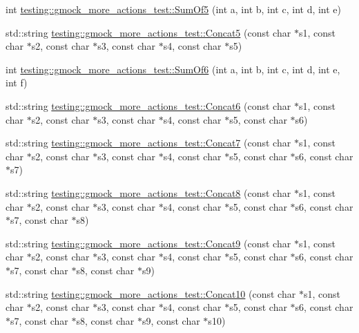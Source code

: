 \begin{DoxyCompactItemize}
int \mbox{\hyperlink{namespacetesting_1_1gmock__more__actions__test_a38e64569bf08e83c6db22c1fb0fe0af6}{testing\+::gmock\+\_\+more\+\_\+actions\+\_\+test\+::\+Sum\+Of5}} (int a, int b, int c, int d, int e)
\item 
std\+::string \mbox{\hyperlink{namespacetesting_1_1gmock__more__actions__test_ad96d89b9c9dd13ef8df8114e4b430e96}{testing\+::gmock\+\_\+more\+\_\+actions\+\_\+test\+::\+Concat5}} (const char $\ast$s1, const char $\ast$s2, const char $\ast$s3, const char $\ast$s4, const char $\ast$s5)
\item 
int \mbox{\hyperlink{namespacetesting_1_1gmock__more__actions__test_a139632d344348fdfa25111d4e43f70ba}{testing\+::gmock\+\_\+more\+\_\+actions\+\_\+test\+::\+Sum\+Of6}} (int a, int b, int c, int d, int e, int f)
\item 
std\+::string \mbox{\hyperlink{namespacetesting_1_1gmock__more__actions__test_a4ddf77266c433ef69d302bfc68153544}{testing\+::gmock\+\_\+more\+\_\+actions\+\_\+test\+::\+Concat6}} (const char $\ast$s1, const char $\ast$s2, const char $\ast$s3, const char $\ast$s4, const char $\ast$s5, const char $\ast$s6)
\item 
std\+::string \mbox{\hyperlink{namespacetesting_1_1gmock__more__actions__test_a2ed0b2da1e123d5aaef59b0ea37e3844}{testing\+::gmock\+\_\+more\+\_\+actions\+\_\+test\+::\+Concat7}} (const char $\ast$s1, const char $\ast$s2, const char $\ast$s3, const char $\ast$s4, const char $\ast$s5, const char $\ast$s6, const char $\ast$s7)
\item 
std\+::string \mbox{\hyperlink{namespacetesting_1_1gmock__more__actions__test_aa4419cf22a6e6760b8d38828f088cae1}{testing\+::gmock\+\_\+more\+\_\+actions\+\_\+test\+::\+Concat8}} (const char $\ast$s1, const char $\ast$s2, const char $\ast$s3, const char $\ast$s4, const char $\ast$s5, const char $\ast$s6, const char $\ast$s7, const char $\ast$s8)
\item 
std\+::string \mbox{\hyperlink{namespacetesting_1_1gmock__more__actions__test_a302f1938b41c2ce503a7628aa45cd017}{testing\+::gmock\+\_\+more\+\_\+actions\+\_\+test\+::\+Concat9}} (const char $\ast$s1, const char $\ast$s2, const char $\ast$s3, const char $\ast$s4, const char $\ast$s5, const char $\ast$s6, const char $\ast$s7, const char $\ast$s8, const char $\ast$s9)
\item 
std\+::string \mbox{\hyperlink{namespacetesting_1_1gmock__more__actions__test_a4a2fcb45125cd238e4146a4b0c568414}{testing\+::gmock\+\_\+more\+\_\+actions\+\_\+test\+::\+Concat10}} (const char $\ast$s1, const char $\ast$s2, const char $\ast$s3, const char $\ast$s4, const char $\ast$s5, const char $\ast$s6, const char $\ast$s7, const char $\ast$s8, const char $\ast$s9, const char $\ast$s10)

\end{DoxyCompactItemize}
